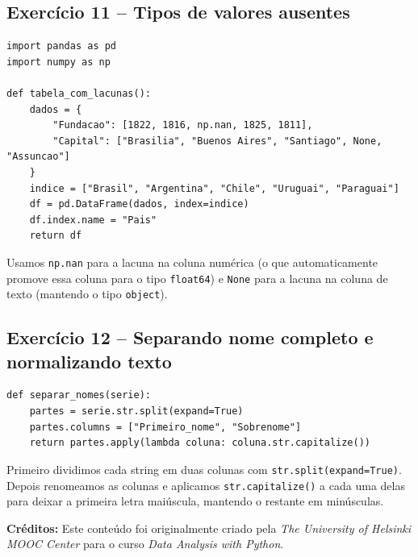 \documentclass[11pt,a4paper]{article}
\begin{document}
\subsection*{Exercício 11 -- Tipos de valores ausentes}
\begin{solucao}
\begin{lstlisting}
import pandas as pd
import numpy as np

def tabela_com_lacunas():
    dados = {
        "Fundacao": [1822, 1816, np.nan, 1825, 1811],
        "Capital": ["Brasilia", "Buenos Aires", "Santiago", None, "Assuncao"]
    }
    indice = ["Brasil", "Argentina", "Chile", "Uruguai", "Paraguai"]
    df = pd.DataFrame(dados, index=indice)
    df.index.name = "Pais"
    return df
\end{lstlisting}
Usamos \texttt{np.nan} para a lacuna na coluna numérica (o que automaticamente promove essa coluna para o tipo \texttt{float64}) e \texttt{None} para a lacuna na coluna de texto (mantendo o tipo \texttt{object}).
\end{solucao}

\subsection*{Exercício 12 -- Separando nome completo e normalizando texto}
\begin{solucao}
\begin{lstlisting}
def separar_nomes(serie):
    partes = serie.str.split(expand=True)
    partes.columns = ["Primeiro_nome", "Sobrenome"]
    return partes.apply(lambda coluna: coluna.str.capitalize())
\end{lstlisting}
Primeiro dividimos cada string em duas colunas com \texttt{str.split(expand=True)}. Depois renomeamos as colunas e aplicamos \texttt{str.capitalize()} a cada uma delas para deixar a primeira letra maiúscula, mantendo o restante em minúsculas.
\end{solucao}

\vspace{2em}
\noindent\textbf{Créditos:} Este conteúdo foi originalmente criado pela \textit{The University of Helsinki MOOC Center} para o curso \textit{Data Analysis with Python}.
\end{document}
